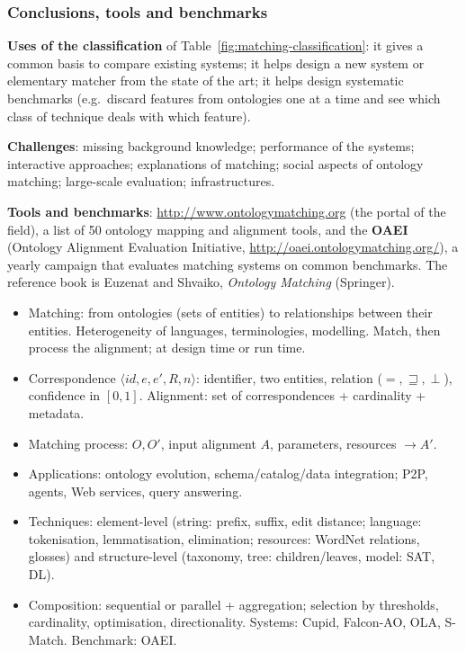 \subsubsection{Conclusions, tools and benchmarks}

\textbf{Uses of the classification} of Table~\ref{fig:matching-classification}: it
gives a common basis to compare existing systems; it helps design a new system or
elementary matcher from the state of the art; it helps design systematic benchmarks
(e.g.\ discard features from ontologies one at a time and see which class of technique
deals with which feature).

\textbf{Challenges}: missing background knowledge; performance of the systems;
interactive approaches; explanations of matching; social aspects of ontology matching;
large-scale evaluation; infrastructures.

\textbf{Tools and benchmarks}: \url{http://www.ontologymatching.org} (the portal of the
field), a list of 50 ontology mapping and alignment tools, and the \textbf{OAEI}
(Ontology Alignment Evaluation Initiative, \url{http://oaei.ontologymatching.org/}), a
yearly campaign that evaluates matching systems on common benchmarks. The reference
book is Euzenat and Shvaiko, \emph{Ontology Matching} (Springer).

\begin{nbsummary}
\begin{itemize}[nosep]
  \item Matching: from ontologies (sets of entities) to relationships between their
        entities. Heterogeneity of languages, terminologies, modelling. Match, then
        process the alignment; at design time or run time.
  \item Correspondence $\langle id, e, e', R, n\rangle$: identifier, two entities,
        relation ($=, \sqsupseteq, \perp$), confidence in $[0,1]$. Alignment: set of
        correspondences + cardinality + metadata.
  \item Matching process: $O, O'$, input alignment $A$, parameters, resources $\to A'$.
  \item Applications: ontology evolution, schema/catalog/data integration; P2P, agents,
        Web services, query answering.
  \item Techniques: element-level (string: prefix, suffix, edit distance; language:
        tokenisation, lemmatisation, elimination; resources: WordNet relations, glosses)
        and structure-level (taxonomy, tree: children/leaves, model: SAT, DL).
  \item Composition: sequential or parallel + aggregation; selection by thresholds,
        cardinality, optimisation, directionality. Systems: Cupid, Falcon-AO, OLA,
        S-Match. Benchmark: OAEI.
\end{itemize}
\end{nbsummary}
